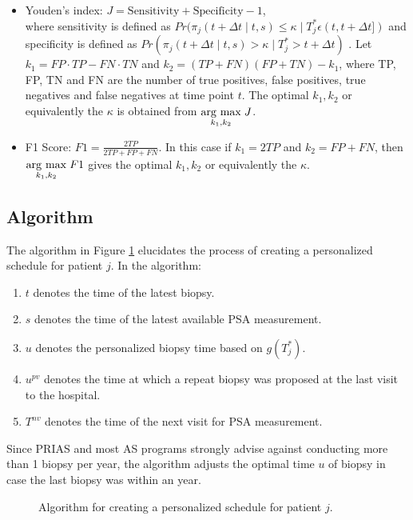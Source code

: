 \begin{itemize}

\item Youden's index: $J = \text{Sensitivity} + \text{Specificity}- 1$,\\
where sensitivity is defined as $Pr(\pi_j(t + \Delta t \mid t,s) \leq \kappa \mid T^*_j \epsilon (t, t + \Delta t])$ and specificity is defined as $Pr(\pi_j(t + \Delta t \mid t,s) > \kappa \mid T^*_j > t + \Delta t)$ \citep{rizopoulosJMbayes}. Let $k_1 = FP \cdot TP - FN \cdot TN$ and $k_2 = (TP+FN)(FP+TN) - k_1$, where TP, FP, TN and FN are the number of true positives, false positives, true negatives and false negatives at time point $t$. The optimal $k_1, k_2$ or equivalently the $\kappa$ is obtained from $\underset{k_1, k_2}{\operatorname{arg}\,\operatorname{max}}\; J$.

\item F1 Score: $F1 = \frac{2TP}{2TP + FP + FN}$. In this case if $k_1 = 2TP$ and $k_2 = FP + FN$, then $\underset{k_1, k_2}{\operatorname{arg}\,\operatorname{max}}\; F1$ gives the optimal $k_1, k_2$ or equivalently the $\kappa$.
\end{itemize}

\subsection{Algorithm}
\label{subsec : pers_sched_algorithm}
The algorithm in Figure \ref{fig : sched_algorithm} elucidates the process of creating a personalized schedule for patient $j$. In the algorithm:

\begin{enumerate}
\item $t$ denotes the time of the latest biopsy.
\item $s$ denotes the time of the latest available PSA measurement.
\item $u$ denotes the personalized biopsy time based on $g(T^*_j)$.
\item $u^{pv}$ denotes the time at which a repeat biopsy was proposed at the last visit to the hospital.
\item $T^{nv}$ denotes the time of the next visit for PSA measurement.
\end{enumerate}
Since PRIAS and most AS programs strongly advise against conducting more than 1 biopsy per year, the algorithm adjusts the optimal time $u$ of biopsy in case the last biopsy was within an year.

\begin{figure}
\centering
\captionsetup{justification=centering}

\caption{Algorithm for creating a personalized schedule for patient $j$.} 
\label{fig : sched_algorithm}
\end{figure}